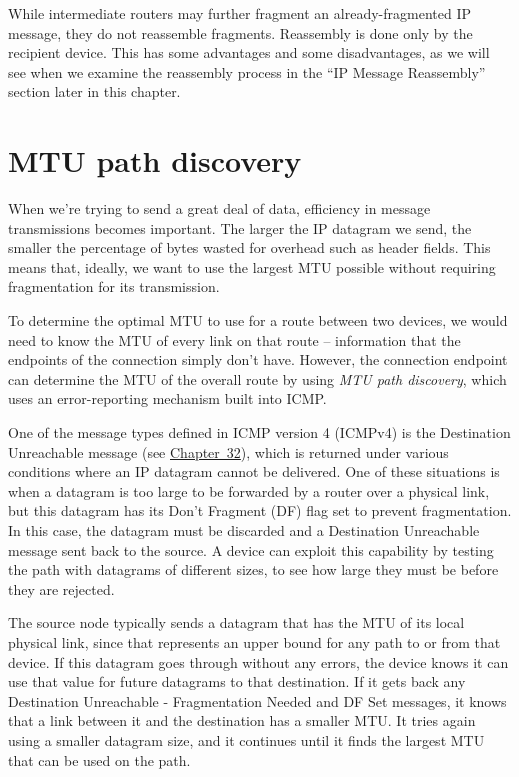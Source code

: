 \begin{note}
While intermediate routers may further fragment an already-fragmented IP message, they do not reassemble fragments.
Reassembly is done only by the recipient device.
This has some advantages and some disadvantages, as we will see when we examine the reassembly process in the ``IP Message Reassembly'' section later in this
chapter.
\end{note}



\section{MTU path discovery}

When we're trying to send a great deal of data, efficiency in message transmissions becomes important.
The larger the IP datagram we send, the smaller the percentage of bytes wasted for overhead such as header fields.
This means that, ideally, we want to use the largest MTU possible without requiring fragmentation for its transmission.

To determine the optimal MTU to use for a route between two devices, we
would need to know the MTU of every link on that route -- information that the endpoints of the connection simply don't have.
However, the connection endpoint can determine the MTU of the overall route by using
\emph{MTU path discovery}, which uses an error-reporting mechanism built into ICMP.

One of the message types defined in ICMP version 4 (ICMPv4) is the
Destination Unreachable message (see \protect\hyperlink{ch32.html}{Chapter~32}),
which is returned under various conditions where an IP datagram cannot
be delivered. One of these situations is when a datagram is too large to
be forwarded by a router over a physical link, but this datagram has its
Don't Fragment (DF) flag set to prevent fragmentation. In this case, the
datagram must be discarded and a Destination Unreachable message sent
back to the source. A device can exploit this capability by testing the
path with datagrams of different sizes, to see how large they must be
before they are rejected.

The source node typically sends a datagram that has the MTU of its local
physical link, since that represents an upper bound for any path to or
from that device. If this datagram goes through without any errors, the
device knows it can use that value for future datagrams to that
destination. If it gets back any Destination Unreachable - Fragmentation
Needed and DF Set messages, it knows that a link between it and the
destination has a smaller MTU. It tries again using a smaller datagram
size, and it continues until it finds the largest MTU that can be used
on the path.


